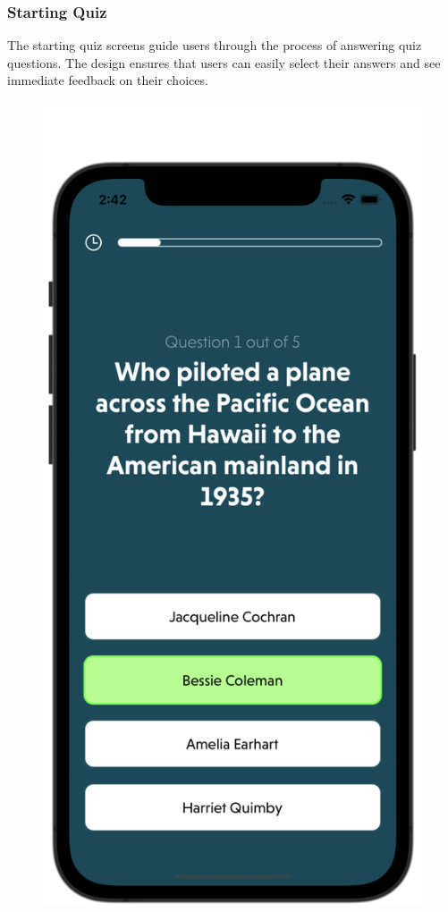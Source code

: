 \vspace{1cm}

\subsubsection{Starting Quiz}

The starting quiz screens guide users through the process of answering quiz questions. The design ensures that users can easily select their answers and see immediate feedback on their choices.

\begin{figure}[H]
    \centering
    \begin{minipage}[b]{0.43\linewidth}
        \centering
        \includegraphics[width=\linewidth]{Mobile UI/User Selecting an option after starting a quiz.png}

\end{minipage}
\end{figure}
